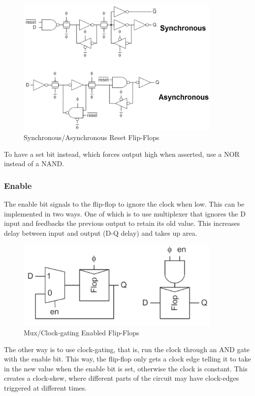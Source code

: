 \documentclass{article}
\begin{document}
\begin{figure}[ht!]
\centering
\includegraphics[width=100mm]{Reset.png}
\caption{Synchronous/Asynchronous Reset Flip-Flops}
\end{figure}

To have a set bit instead, which forces output high when asserted, use a NOR instead of a NAND.

\subsubsection{Enable}

The enable bit signals to the flip-flop to ignore the clock when low. This can be implemented in two ways. One of which is to use multiplexer that ignores the D input and feedbacks the previous output to retain its old value. This increases delay between input and output (D-Q delay) and takes up area. 

\begin{figure}[ht!]
\centering
\includegraphics[width=100mm]{Enable.png}
\caption{Mux/Clock-gating Enabled Flip-Flops}
\end{figure}

The other way is to use clock-gating, that is, run the clock through an AND gate with the enable bit. This way, the flip-flop only gets a clock edge telling it to take in the new value when the enable bit is set, otherwise the clock is constant. This creates a clock-skew, where different parts of the circuit may have clock-edges triggered at different times. 
\end{document}
